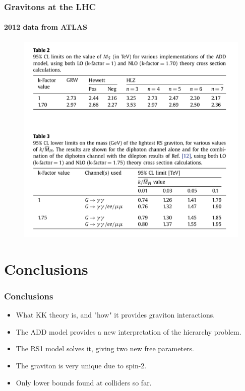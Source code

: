 \documentclass[10pt]{beamer}
\begin{document}
	\begin{frame}
		\frametitle{Gravitons at the LHC}
		\framesubtitle{2012 data from ATLAS}
		\begin{figure}[H]
			\centering
			\includegraphics[scale=0.2]{table.png}
		\end{figure}
	\end{frame}
	
	\section{Conclusions}
	\begin{frame}
		\frametitle{Conclusions}
		\begin{itemize}
			\item What KK theory is, and "how" it provides graviton interactions.
			\item The ADD model provides a new interpretation of the hierarchy problem.
			\item The RS1 model solves it, giving two new free parameters.
			\item The graviton is very unique due to spin-2.
			\item Only lower bounds found at colliders so far.
		\end{itemize}
	\end{frame}
	
\end{document}
